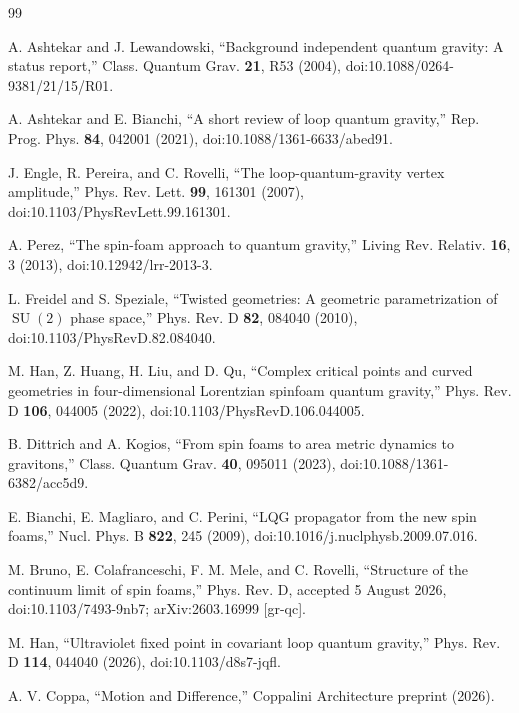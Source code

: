 \documentclass[aps,prd,reprint,nofootinbib,superscriptaddress]{revtex4-2}
\newcommand{\SU}{\operatorname{SU}}
\begin{document}
\begin{thebibliography}{99}

A. Ashtekar and J. Lewandowski,
``Background independent quantum gravity: A status report,''
Class. Quantum Grav. \textbf{21}, R53 (2004),
doi:10.1088/0264-9381/21/15/R01.

A. Ashtekar and E. Bianchi,
``A short review of loop quantum gravity,''
Rep. Prog. Phys. \textbf{84}, 042001 (2021),
doi:10.1088/1361-6633/abed91.

J. Engle, R. Pereira, and C. Rovelli,
``The loop-quantum-gravity vertex amplitude,''
Phys. Rev. Lett. \textbf{99}, 161301 (2007),
doi:10.1103/PhysRevLett.99.161301.

A. Perez,
``The spin-foam approach to quantum gravity,''
Living Rev. Relativ. \textbf{16}, 3 (2013),
doi:10.12942/lrr-2013-3.

L. Freidel and S. Speziale,
``Twisted geometries: A geometric parametrization of $\SU(2)$ phase space,''
Phys. Rev. D \textbf{82}, 084040 (2010),
doi:10.1103/PhysRevD.82.084040.

M. Han, Z. Huang, H. Liu, and D. Qu,
``Complex critical points and curved geometries in four-dimensional Lorentzian spinfoam quantum gravity,''
Phys. Rev. D \textbf{106}, 044005 (2022),
doi:10.1103/PhysRevD.106.044005.

B. Dittrich and A. Kogios,
``From spin foams to area metric dynamics to gravitons,''
Class. Quantum Grav. \textbf{40}, 095011 (2023),
doi:10.1088/1361-6382/acc5d9.

E. Bianchi, E. Magliaro, and C. Perini,
``LQG propagator from the new spin foams,''
Nucl. Phys. B \textbf{822}, 245 (2009),
doi:10.1016/j.nuclphysb.2009.07.016.

M. Bruno, E. Colafranceschi, F. M. Mele, and C. Rovelli,
``Structure of the continuum limit of spin foams,''
Phys. Rev. D, accepted 5 August 2026,
doi:10.1103/7493-9nb7; arXiv:2603.16999 [gr-qc].

M. Han,
``Ultraviolet fixed point in covariant loop quantum gravity,''
Phys. Rev. D \textbf{114}, 044040 (2026),
doi:10.1103/d8s7-jqfl.

A. V. Coppa,
``Motion and Difference,''
Coppalini Architecture preprint (2026).

\end{thebibliography}
\end{document}
